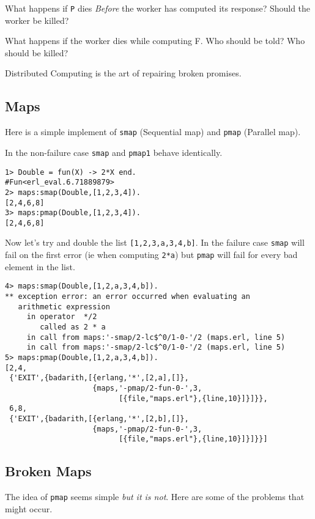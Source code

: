 \documentclass[10pt]{article}
\begin{document}
What happens if \verb+P+ dies {\sl Before} the worker has computed
its response? Should the worker be killed?

What happens if the worker dies while computing F. Who should be told?
Who should be killed?

Distributed Computing is the art of repairing broken promises.

\subsection{Maps}

Here is a simple implement of \verb+smap+ (Sequential map) and
\verb+pmap+ (Parallel map).


In the non-failure case \verb+smap+ and \verb+pmap1+ behave
identically.

\begin{Verbatim}
1> Double = fun(X) -> 2*X end.
#Fun<erl_eval.6.71889879>
2> maps:smap(Double,[1,2,3,4]).
[2,4,6,8]
3> maps:pmap(Double,[1,2,3,4]). 
[2,4,6,8]
\end{Verbatim}

Now let's try and double the list \verb+[1,2,3,a,3,4,b]+. In the
failure case \verb+smap+ will fail on the first error (ie when
computing \verb+2*a+) but \verb+pmap+ will fail for every bad element in
the list.

\begin{Verbatim}
4> maps:smap(Double,[1,2,a,3,4,b]).
** exception error: an error occurred when evaluating an 
   arithmetic expression
     in operator  */2
        called as 2 * a
     in call from maps:'-smap/2-lc$^0/1-0-'/2 (maps.erl, line 5)
     in call from maps:'-smap/2-lc$^0/1-0-'/2 (maps.erl, line 5)
5> maps:pmap(Double,[1,2,a,3,4,b]).
[2,4,
 {'EXIT',{badarith,[{erlang,'*',[2,a],[]},
                    {maps,'-pmap/2-fun-0-',3,
                          [{file,"maps.erl"},{line,10}]}]}},
 6,8,
 {'EXIT',{badarith,[{erlang,'*',[2,b],[]},
                    {maps,'-pmap/2-fun-0-',3,
                          [{file,"maps.erl"},{line,10}]}]}}]

\end{Verbatim}

\subsection{Broken Maps}

The idea of \verb+pmap+ seems simple {\sl but it is not}.
Here are some of the problems that might occur.
\end{document}
